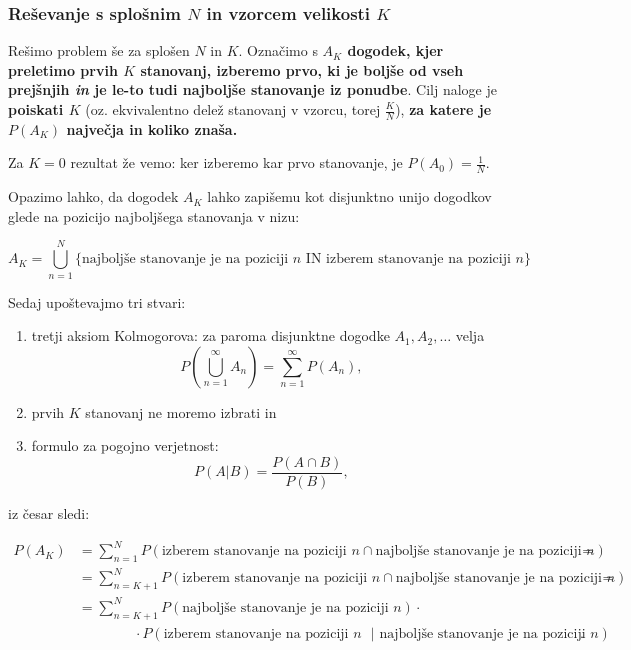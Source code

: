 \documentclass[a4paper, 12pt, titlepage]{article}
\begin{document}
\subsubsection{Reševanje s splošnim $N$ in vzorcem velikosti $K$}

Rešimo problem še za splošen $N$ in $K$. Označimo s \textbf{$A_{K}$ dogodek, kjer preletimo prvih $K$ stanovanj, izberemo prvo, ki je boljše od vseh prejšnjih \emph{in} je le-to tudi najboljše stanovanje iz ponudbe}. Cilj naloge je \textbf{poiskati $K$} (oz. ekvivalentno delež stanovanj v vzorcu, torej $\frac{K}{N}$), \textbf{za katere je $P(A_{K})$ največja in koliko znaša.}

Za $K=0$ rezultat že vemo: ker izberemo kar prvo stanovanje, je $P(A_{0})=\frac{1}{N}$.

Opazimo lahko, da dogodek $A_{K}$ lahko zapišemu kot disjunktno unijo dogodkov glede na pozicijo najboljšega stanovanja v nizu:

\begin{equation*}
A_{K} = \bigcup^{N}_{n=1}\{\text{najboljše stanovanje je na poziciji $n$ IN izberem stanovanje na poziciji $n$}\}
\end{equation*}

Sedaj upoštevajmo tri stvari: \label{tristvari}
\begin{enumerate}
    \item tretji aksiom Kolmogorova: za paroma disjunktne dogodke $A_{1}, A_{2}, \ldots$ velja $$P(\bigcup^{\infty}_{n=1}A_{n}) = \sum^{\infty}_{n=1}P(A_{n}),$$
    \item prvih $K$ stanovanj ne moremo izbrati in
    \item formulo za pogojno verjetnost: $$P(A | B)=\frac{P(A \cap B)}{P(B)},$$
\end{enumerate}

iz česar sledi:

\begin{align*}
    P(A_{K}) &= \sum^{N}_{n=1}P(\text{izberem stanovanje na poziciji $n$} \cap \text{najboljše stanovanje je na poziciji $n$}) = \\
    &= \sum^{N}_{n=K+1}P(\text{izberem stanovanje na poziciji $n$} \cap \text{najboljše stanovanje je na poziciji $n$}) = \\
    &= \sum^{N}_{n=K+1}P(\text{najboljše stanovanje je na poziciji $n$}) \cdot \\
    & \qquad \qquad \cdot P(\text{izberem stanovanje na poziciji $n$ } | \text{ najboljše stanovanje je na poziciji $n$}).
\end{align*}
\end{document}
